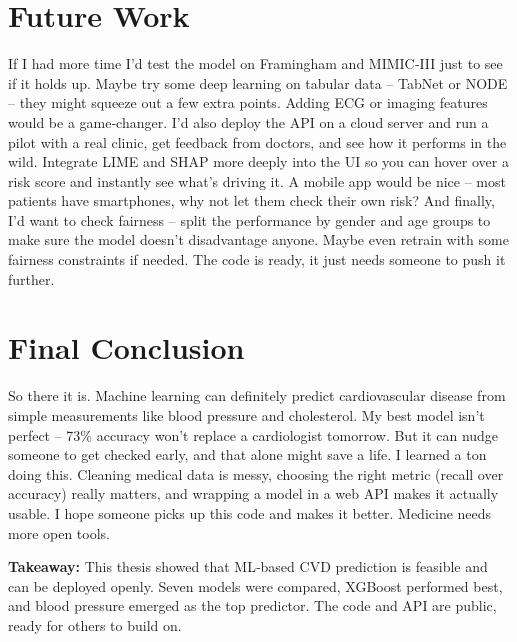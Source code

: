 \documentclass[11pt, a4paper, oneside]{book}
\begin{document}
\section{Future Work}
If I had more time I’d test the model on Framingham and MIMIC‑III just to see if it holds up. Maybe try some deep learning on tabular data – TabNet or NODE – they might squeeze out a few extra points. Adding ECG or imaging features would be a game‑changer. I’d also deploy the API on a cloud server and run a pilot with a real clinic, get feedback from doctors, and see how it performs in the wild. Integrate LIME and SHAP more deeply into the UI so you can hover over a risk score and instantly see what’s driving it. A mobile app would be nice – most patients have smartphones, why not let them check their own risk? And finally, I’d want to check fairness – split the performance by gender and age groups to make sure the model doesn’t disadvantage anyone. Maybe even retrain with some fairness constraints if needed. The code is ready, it just needs someone to push it further.

\section{Final Conclusion}
So there it is. Machine learning can definitely predict cardiovascular disease from simple measurements like blood pressure and cholesterol. My best model isn’t perfect – 73\% accuracy won’t replace a cardiologist tomorrow. But it can nudge someone to get checked early, and that alone might save a life. I learned a ton doing this. Cleaning medical data is messy, choosing the right metric (recall over accuracy) really matters, and wrapping a model in a web API makes it actually usable. I hope someone picks up this code and makes it better. Medicine needs more open tools.

\begin{takeaway}
\textbf{Takeaway:} This thesis showed that ML‑based CVD prediction is feasible and can be deployed openly. Seven models were compared, XGBoost performed best, and blood pressure emerged as the top predictor. The code and API are public, ready for others to build on.
\end{takeaway}
\end{document}
